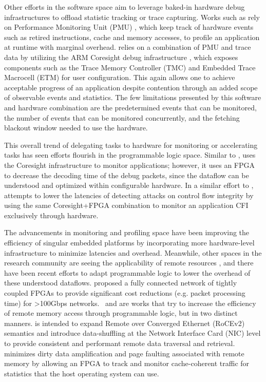 Other efforts in the software space aim to leverage baked-in hardware debug infrastructures to offload statistic tracking or trace capturing. Works such as \cite{RT-Bench} \cite{bellecAttackDetection} rely on Performance Monitoring Unit (PMU) \cite{ia64_swdev_vol3} \cite{aarch64_spec}, which keep track of hardware events such as retired instructions, cache and memory accesses, to profile an application at runtime with marginal overhead. \cite{chenTPA} relies on a combination of PMU and trace data by utilizing the ARM Coresight debug infrastructure \cite{CoreSight}, which exposes components such as the Trace Memory Controller (TMC)\cite{TMC} and Embedded Trace Macrocell (ETM)\cite{etm} for user configuration. This again allows one to achieve acceptable progress of an application despite contention through an added scope of observable events and statistics. The few limitations presented by this software and hardware combination are the predetermined events that can be monitored, the number of events that can be monitored concurrently, and the fetching blackout window needed to use the hardware.

This overall trend of delegating tasks to hardware for monitoring or accelerating tasks has seen efforts flourish in the programmable logic space. Similar to \cite{chenTPA}, \cite{hoppe21} uses the Coresight infrastructure to monitor applications; however, it uses an FPGA to decrease the decoding time of the debug packets, since the dataflow can be understood and optimized within configurable hardware. In a similar effort to \cite{bellecAttackDetection}, \cite{Feng21} attempts to lower the latencies of detecting attacks on control flow integrity by using the same Coresight+FPGA combination to monitor an application CFI exclusively through hardware.

The advancements in monitoring and profiling space have been improving the efficiency of singular embedded platforms by incorporating more hardware-level infrastructure to minimize latencies and overhead. Meanwhile, other spaces in the research community are seeing the applicability of remote resources \cite{AguileraVmWare}, and there have been recent efforts to adapt programmable logic to lower the overhead of these understood dataflows. \cite{MizutaniOPTWEB} proposed a fully connected network of tightly coupled FPGAs to provide significant cost reductions (e.g. packet processing time) for >100Gbps networks.~\cite{CalciuPberry} and \cite{SidlerStrom} are works that try to increase the efficiency of remote memory access through programmable logic, but in two distinct manners. \cite{SidlerStrom} is intended to expand Remote over Converged Ethernet (RoCEv2) semantics and introduce data-shuffling at the Network Interface Card (NIC) level to provide consistent and performant remote data traversal and retrieval. \cite{CalciuPberry} minimizes dirty data amplification and page faulting associated with remote memory by allowing an FPGA to track and monitor cache-coherent traffic for statistics that the host operating system can use.

